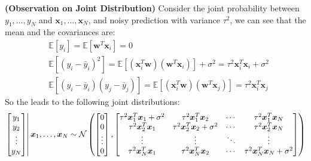 \begin{remark}{\textbf{(Observation on Joint Distribution)}}
    Consider the joint probability between $y_1,\dots,y_N$ and $\boldsymbol x_1, \dots,\boldsymbol x_N$, and noisy prediction with variance $\tau^2$, we can see that the mean and the covariances are:
    \begin{equation*}
    \begin{aligned}
        &\mathbb{E}[y_i] = \mathbb{E}[\boldsymbol w^T\boldsymbol x_i] = 0 \\
        &\mathbb{E}[(y_i-\bar{y}_i)^2] = \mathbb{E}[(\boldsymbol x_i^T\boldsymbol w)(\boldsymbol w^T\boldsymbol x_i)] + \sigma^2 = \tau^2\boldsymbol x_i^T\boldsymbol x_i + \sigma^2 \\
        &\mathbb{E}[(y_i-\bar{y}_i)(y_j-\bar{y}_j)] = \mathbb{E}[(\boldsymbol x_i^T\boldsymbol w)(\boldsymbol w^T\boldsymbol x_j)] = \tau^2 \boldsymbol x_i^T\boldsymbol x_j
    \end{aligned}
    \end{equation*}
    So the leads to the following joint distributions:
    \begin{equation*}
        \left.\begin{bmatrix}
            y_1 \\ y_2 \\ \vdots \\ y_N
        \end{bmatrix}\right| \boldsymbol x_1,\dots,\boldsymbol x_N \sim \mathcal{N}\bracka{\begin{bmatrix}
            0 \\ 0 \\ \vdots \\ 0
        \end{bmatrix}, \begin{bmatrix}
            \tau^2\boldsymbol x_1^T\boldsymbol x_1 + \sigma^2 & \tau^2\boldsymbol x_1^T\boldsymbol x_2 & \cdots & \tau^2\boldsymbol x_1^T\boldsymbol x_N \\
            \tau^2\boldsymbol x_2^T\boldsymbol x_1 & \tau^2\boldsymbol x_2^T\boldsymbol x_2 + \sigma^2 & \cdots & \tau^2\boldsymbol x_2^T\boldsymbol x_N \\
            \vdots & \vdots & \ddots & \vdots \\
            \tau^2\boldsymbol x_N^T\boldsymbol x_1 & \tau^2\boldsymbol x_N^T\boldsymbol x_2 & \cdots & \tau^2\boldsymbol x_N^T\boldsymbol x_N + \sigma^2  \\
        \end{bmatrix}}

\end{equation*}
\end{remark}
